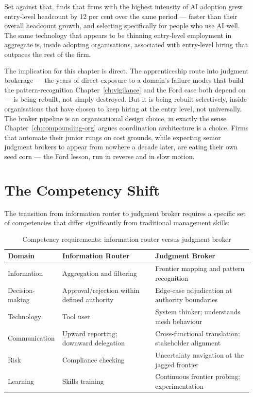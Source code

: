 Set against that, \textcite{RampRevelio2026} finds that firms with the highest intensity of AI adoption grew entry-level headcount by 12 per cent over the same period --- faster than their overall headcount growth, and selecting specifically for people who use AI well. The same technology that appears to be thinning entry-level employment in aggregate is, inside adopting organisations, associated with entry-level hiring that outpaces the rest of the firm.

The implication for this chapter is direct. The apprenticeship route into judgment brokerage --- the years of direct exposure to a domain's failure modes that build the pattern-recognition Chapter~\ref{ch:vigilance} and the Ford case both depend on --- is being rebuilt, not simply destroyed. But it is being rebuilt selectively, inside organisations that have chosen to keep hiring at the entry level, not universally. The broker pipeline is an organisational design choice, in exactly the sense Chapter~\ref{ch:compounding-org} argues coordination architecture is a choice. Firms that automate their junior rungs on cost grounds, while expecting senior judgment brokers to appear from nowhere a decade later, are eating their own seed corn --- the Ford lesson, run in reverse and in slow motion.

\section{The Competency Shift}

The transition from information router to judgment broker requires a specific set of competencies that differ significantly from traditional management skills:

\begin{table}[h]
\centering
\caption{Competency requirements: information router versus judgment broker}
\label{tab:competency-shift}
\begin{tabularx}{\textwidth}{l X X}
\toprule
\textbf{Domain} & \textbf{Information Router} & \textbf{Judgment Broker} \\
\midrule
Information & Aggregation and filtering & Frontier mapping and pattern recognition \\
\addlinespace
Decision-making & Approval/rejection within defined authority & Edge-case adjudication at authority boundaries \\
\addlinespace
Technology & Tool user & System thinker; understands mesh behaviour \\
\addlinespace
Communication & Upward reporting; downward delegation & Cross-functional translation; stakeholder alignment \\
\addlinespace
Risk & Compliance checking & Uncertainty navigation at the jagged frontier \\
\addlinespace
Learning & Skills training & Continuous frontier probing; experimentation \\
\bottomrule
\end{tabularx}
\end{table}

